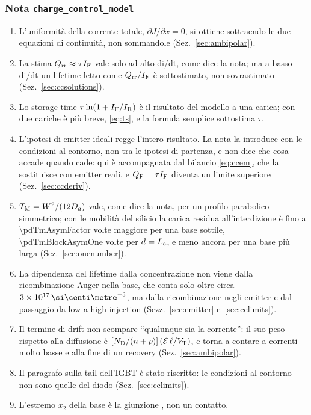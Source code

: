 \documentclass[10pt,a4paper]{scrartcl}
\let\newcommand\pdvaluedefine
\newcommand{\IF}{I_\mathrm{F}}
\newcommand{\IR}{I_\mathrm{R}}
\newcommand{\Qrr}{Q_\mathrm{rr}}
\newcommand{\TM}{T_\mathrm{M}}
\newcommand{\VT}{V_\mathrm{T}}
\newcommand{\Ef}{\mathcal{E}}                 %
\newcommand{\ND}{N_\mathrm{D}}
\newcommand{\La}{L_\mathrm{a}}
\newcommand{\QF}{Q_\mathrm{F}}
\newcommand{\Nm}{n\textsuperscript{--}}
\newcommand{\Np}{n\textsuperscript{+}}
\newcommand{\cmc}{\si{\centi\metre^{-3}}}
\begin{document}
\subsubsection*{Nota \texttt{charge\_control\_model}}
\begin{enumerate}
\item L'uniformità della corrente totale, $\partial J/\partial x = 0$, si ottiene sottraendo le due equazioni di continuità, non sommandole (Sez.~\ref{sec:ambipolar}).
\item La stima $\Qrr \approx \tau\IF$ vale solo ad alto di/dt, come dice la nota; ma a basso di/dt un lifetime letto come $\Qrr/\IF$ è sottostimato, non sovrastimato (Sez.~\ref{sec:ccsolutions}).
\item Lo storage time $\tau\ln(1+\IF/\IR)$ è il risultato del modello a una carica; con due cariche è più breve, \eqref{eq:ts}, e la formula semplice sottostima $\tau$.
\item L'ipotesi di emitter ideali regge l'intero risultato. La nota la introduce con le condizioni al contorno, non tra le ipotesi di partenza, e non dice che cosa accade quando cade: qui è accompagnata dal bilancio \eqref{eq:ccem}, che la sostituisce con emitter reali, e $\QF = \tau\IF$ diventa un limite superiore (Sez.~\ref{sec:ccderiv}).
\item $\TM = W^2/(12D_a)$ vale, come dice la nota, per un profilo parabolico simmetrico; con le mobilità del silicio la carica residua all'interdizione è fino a \num{\pdTmAsymFactor} volte maggiore per una base sottile, \num{\pdTmBlockAsymOne} volte per $d = \La$, e meno ancora per una base più larga (Sez.~\ref{sec:onenumber}).
\item La dipendenza del lifetime dalla concentrazione non viene dalla ricombinazione Auger nella base, che conta solo oltre circa $3\times10^{17}\,\cmc$, ma dalla ricombinazione negli emitter e dal passaggio da low a high injection (Sezz.~\ref{sec:emitter} e~\ref{sec:cclimits}).
\item Il termine di drift non scompare ``qualunque sia la corrente'': il suo peso rispetto alla diffusione è $[\ND/({n+p})]\,(\Ef\,\ell/\VT)$, e torna a contare a correnti molto basse e alla fine di un recovery (Sez.~\ref{sec:ambipolar}).
\item Il paragrafo sulla tail dell'IGBT è stato riscritto: le condizioni al contorno non sono quelle del diodo (Sez.~\ref{sec:cclimits}).
\item L'estremo $x_2$ della base è la giunzione \Nm\Np, non un contatto.
\end{enumerate}
\end{document}
